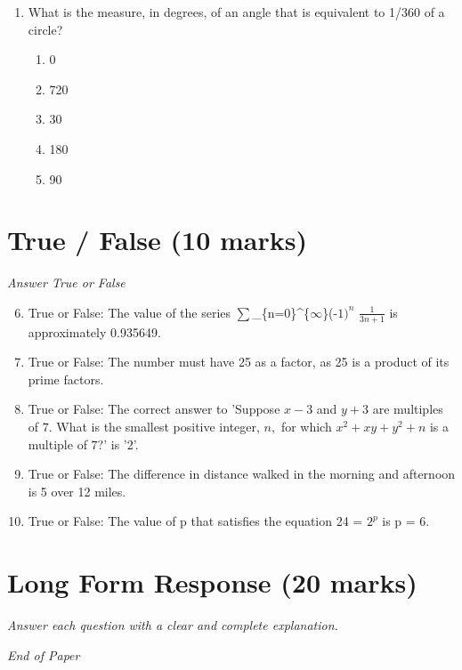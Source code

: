 \documentclass[12pt]{article}
\begin{document}
\begin{enumerate}[label=\arabic*.]
\begin{enumerate}[label=(\alph*)]
    \item \ensuremath{\sqrt{7}}
    \item 3\ensuremath{\sqrt{2}}
    \item 5\ensuremath{\sqrt{2}}
    \item 2
\end{enumerate}
\item What is the measure, in degrees, of an angle that is equivalent to 1/360 of a circle?
\begin{enumerate}[label=(\alph*)]
    \item 0
    \item 720
    \item 30
    \item 180
    \item 90
\end{enumerate}
\end{enumerate}

\section*{True / False (10 marks)}
\textit{Answer True or False}
\begin{enumerate}[label=\arabic*.]
\setcounter{enumi}{5}
\item True or False: The value of the series \ensuremath{\sum}\_\{n=0\}^\{\ensuremath{\infty}\}(-$1)^n$ \ensuremath{\frac{1}{3 n+1}} is approximately 0.935649.
\item True or False: The number must have 25 as a factor, as 25 is a product of its prime factors.
\item True or False: The correct answer to 'Suppose $x-3$ and $y+3$ are multiples of $7$. What is the smallest positive integer, $n,$ for which $x^2+xy+y^2+n$ is a multiple of $7$?' is '2'.
\item True or False: The difference in distance walked in the morning and afternoon is 5 over 12 miles.
\item True or False: The value of p that satisfies the equation 24 = $2^p$ is p = 6.
\end{enumerate}

\section*{Long Form Response (20 marks)}
\textit{Answer each question with a clear and complete explanation.}

\vfill
\noindent\textit{End of Paper}
\end{document}
